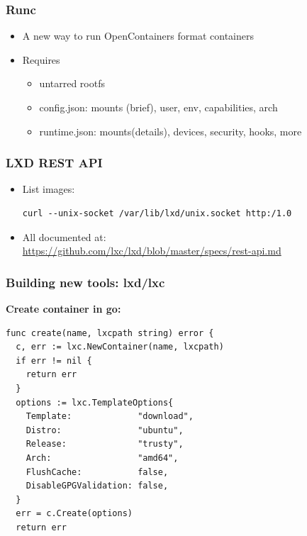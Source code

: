\documentclass{beamer}
\begin{document}
\begin{frame}
\frametitle{Runc}
\begin{itemize}
\item A new way to run OpenContainers format containers
\item Requires
  \begin{itemize}
  \item untarred rootfs
  \item config.json: mounts (brief), user, env, capabilities, arch
  \item runtime.json: mounts(details), devices, security, hooks, more
  \end{itemize}
\end{itemize}
\end{frame}

\begin{frame}[fragile]
\frametitle{LXD REST API}
\begin{itemize}
\item List images: \\
{\tiny
  \begin{lstlisting}
curl --unix-socket /var/lib/lxd/unix.socket http:/1.0
  \end{lstlisting}
}

%
%

\item All documented at: \\
{\tiny
\url{https://github.com/lxc/lxd/blob/master/specs/rest-api.md}
}
\end{itemize}
\end{frame}

\begin{frame}[fragile]
\frametitle{Building new tools: lxd/lxc}
{\bf Create container in go:} \\
{\tiny
\begin{lstlisting}
func create(name, lxcpath string) error {
  c, err := lxc.NewContainer(name, lxcpath)
  if err != nil {
    return err
  }
  options := lxc.TemplateOptions{
    Template:             "download",
    Distro:               "ubuntu",
    Release:              "trusty",
    Arch:                 "amd64",
    FlushCache:           false,
    DisableGPGValidation: false,
  }
  err = c.Create(options)
  return err
\end{lstlisting}
}
\end{frame}
\end{document}
